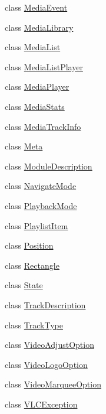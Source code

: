 \begin{DoxyCompactItemize}
class \hyperlink{classsrc_1_1lib_1_1vlc_1_1MediaEvent}{Media\+Event}
\item 
class \hyperlink{classsrc_1_1lib_1_1vlc_1_1MediaLibrary}{Media\+Library}
\item 
class \hyperlink{classsrc_1_1lib_1_1vlc_1_1MediaList}{Media\+List}
\item 
class \hyperlink{classsrc_1_1lib_1_1vlc_1_1MediaListPlayer}{Media\+List\+Player}
\item 
class \hyperlink{classsrc_1_1lib_1_1vlc_1_1MediaPlayer}{Media\+Player}
\item 
class \hyperlink{classsrc_1_1lib_1_1vlc_1_1MediaStats}{Media\+Stats}
\item 
class \hyperlink{classsrc_1_1lib_1_1vlc_1_1MediaTrackInfo}{Media\+Track\+Info}
\item 
class \hyperlink{classsrc_1_1lib_1_1vlc_1_1Meta}{Meta}
\item 
class \hyperlink{classsrc_1_1lib_1_1vlc_1_1ModuleDescription}{Module\+Description}
\item 
class \hyperlink{classsrc_1_1lib_1_1vlc_1_1NavigateMode}{Navigate\+Mode}
\item 
class \hyperlink{classsrc_1_1lib_1_1vlc_1_1PlaybackMode}{Playback\+Mode}
\item 
class \hyperlink{classsrc_1_1lib_1_1vlc_1_1PlaylistItem}{Playlist\+Item}
\item 
class \hyperlink{classsrc_1_1lib_1_1vlc_1_1Position}{Position}
\item 
class \hyperlink{classsrc_1_1lib_1_1vlc_1_1Rectangle}{Rectangle}
\item 
class \hyperlink{classsrc_1_1lib_1_1vlc_1_1State}{State}
\item 
class \hyperlink{classsrc_1_1lib_1_1vlc_1_1TrackDescription}{Track\+Description}
\item 
class \hyperlink{classsrc_1_1lib_1_1vlc_1_1TrackType}{Track\+Type}
\item 
class \hyperlink{classsrc_1_1lib_1_1vlc_1_1VideoAdjustOption}{Video\+Adjust\+Option}
\item 
class \hyperlink{classsrc_1_1lib_1_1vlc_1_1VideoLogoOption}{Video\+Logo\+Option}
\item 
class \hyperlink{classsrc_1_1lib_1_1vlc_1_1VideoMarqueeOption}{Video\+Marquee\+Option}
\item 
class \hyperlink{classsrc_1_1lib_1_1vlc_1_1VLCException}{V\+L\+C\+Exception}
\end{DoxyCompactItemize}
